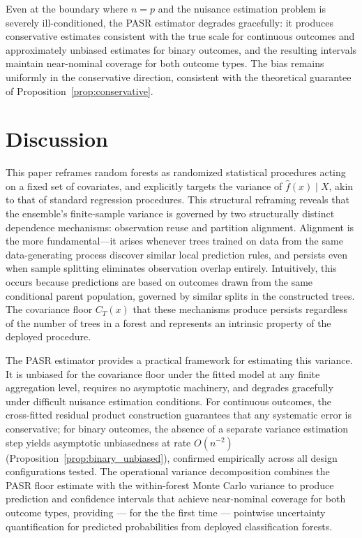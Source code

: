 \documentclass[11pt]{article}
\theoremstyle{plain}
\theoremstyle{definition}
\theoremstyle{remark}
\begin{document}
Even at the boundary where $n = p$ and the nuisance estimation problem is severely ill-conditioned, the PASR estimator degrades gracefully: it produces conservative estimates consistent with the true scale for continuous outcomes and approximately unbiased estimates for binary outcomes, and the resulting intervals maintain near-nominal coverage for both outcome types. The bias remains uniformly in the conservative direction, consistent with the theoretical guarantee of Proposition~\ref{prop:conservative}.

\section{Discussion}
\label{sec:discussion}

This paper reframes random forests as randomized statistical procedures acting on a fixed set of covariates, and explicitly targets the variance of $\hat f(x) \mid X$, akin to that of standard regression procedures. This structural reframing reveals that the ensemble's finite-sample variance is governed by two structurally distinct dependence mechanisms: observation reuse and partition alignment. Alignment is the more fundamental---it arises whenever trees trained on data from the same data-generating process discover similar local prediction rules, and persists even when sample splitting eliminates observation overlap entirely. Intuitively, this occurs because predictions are based on outcomes drawn from the same conditional parent population, governed by similar splits in the constructed trees. The covariance floor $C_T(x)$ that these mechanisms produce persists regardless of the number of trees in a forest and represents an intrinsic property of the deployed procedure.

The PASR estimator provides a practical framework for estimating this variance. It is unbiased for the covariance floor under the fitted model at any finite aggregation level, requires no asymptotic machinery, and degrades gracefully under difficult nuisance estimation conditions. For continuous outcomes, the cross-fitted residual product construction guarantees that any systematic error is conservative; for binary outcomes, the absence of a separate variance estimation step yields asymptotic unbiasedness at rate $O(n^{-2})$ (Proposition~\ref{prop:binary_unbiased}), confirmed empirically across all design configurations tested. The operational variance decomposition combines the PASR floor estimate with the within-forest Monte Carlo variance to produce prediction and confidence intervals that achieve near-nominal coverage for both outcome types, providing --- for the the first time --- pointwise uncertainty quantification for predicted probabilities from deployed classification forests.
\end{document}
